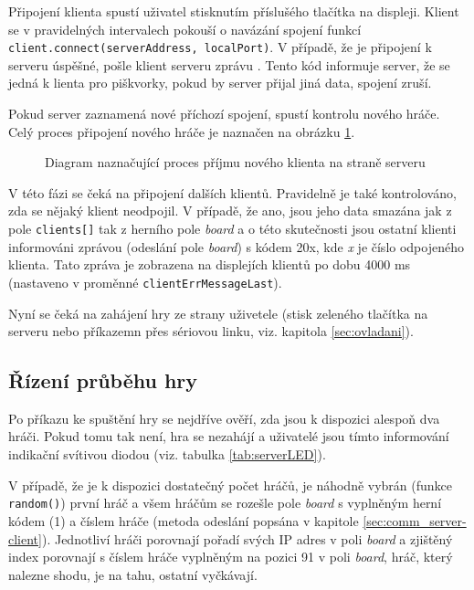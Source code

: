 Připojení klienta spustí uživatel stisknutím příslušého tlačítka na displeji. Klient se v pravidelných intervalech pokouší o navázání spojení funkcí  \\ \mbox{\texttt{client.connect(serverAddress, localPort)}}. V případě, že je připojení k serveru úspěšné, pošle klient serveru zprávu . Tento kód informuje server, že se jedná k lienta pro piškvorky, pokud by server přijal jiná data, spojení zruší.

Pokud server zaznamená nové příchozí spojení, spustí kontrolu nového hráče. Celý proces připojení nového hráče je naznačen na obrázku \ref{fig:flow:newClientServer}.

\begin{figure}
  \centering
  
  \caption{\label{fig:flow:newClientServer} Diagram naznačující proces příjmu nového klienta na straně serveru}
\end{figure}

V této fázi se čeká na připojení dalších klientů. Pravidelně je také kontrolováno, zda se nějaký klient neodpojil. V případě, že ano, jsou jeho data smazána jak z pole \texttt{clients[]} tak z herního pole \textit{board} a o této skutečnosti jsou ostatní klienti informováni zprávou (odeslání pole \textit{board}) s kódem 20x, kde \textit{x} je číslo odpojeného klienta. Tato zpráva je zobrazena na displejích klientů po dobu 4000 ms (nastaveno v proměnné \texttt{clientErrMessageLast}).

Nyní se čeká na zahájení hry ze strany uživetele (stisk zeleného tlačítka na serveru nebo příkazemn přes sériovou linku, viz. kapitola \ref{sec:ovladani}).

\subsection{Řízení průběhu hry}
Po příkazu ke spuštění hry se nejdříve ověří, zda jsou k dispozici alespoň dva hráči. Pokud tomu tak není, hra se nezahájí a uživatelé jsou tímto informování indikační svítivou diodou (viz. tabulka \ref{tab:serverLED}).

V případě, že je k dispozici dostatečný počet hráčů, je náhodně vybrán (funkce \texttt{random()}) první hráč a všem hráčům se rozešle pole \textit{board} s vyplněným herní kódem (1) a číslem hráče (metoda odeslání popsána v kapitole \ref{sec:comm_server-client}). Jednotliví hráči porovnají pořadí svých IP adres v poli \textit{board} a zjištěný index porovnají s číslem hráče vyplněným na pozici 91 v poli \textit{board}, hráč, který nalezne shodu, je na tahu, ostatní vyčkávají.

